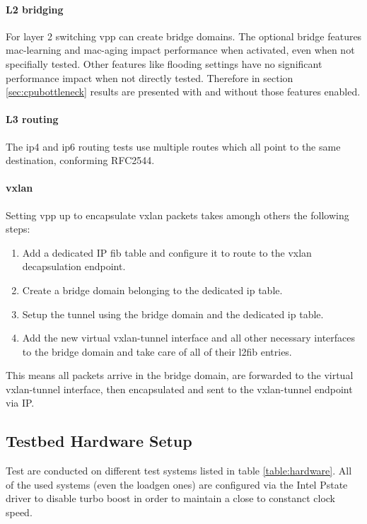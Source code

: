 \paragraph{L2 bridging}

For layer 2 switching \Ac{vpp} can create bridge domains. The optional
bridge features mac-learning and mac-aging impact performance when
activated, even when not specifially tested. Other features like
flooding settings have no significant performance impact when not
directly tested. Therefore in section \ref{sec:cpubottleneck} results
are presented with and without those features enabled.

\paragraph{L3 routing}

The \Ac{ip4} and \Ac{ip6} routing tests use multiple routes which all point to the same destination, conforming RFC2544.

\paragraph{\Ac{vxlan}}

Setting \Ac{vpp} up to encapsulate \Ac{vxlan} packets takes amongh others the following steps: 

\begin{enumerate}
	\item Add a dedicated IP \Ac{fib} table and configure it to route to the \Ac{vxlan} decapsulation endpoint.
	\item Create a bridge domain belonging to the dedicated ip table.
	\item Setup the tunnel using the bridge domain and the dedicated ip table.
	\item Add the new virtual vxlan-tunnel interface and all other necessary interfaces to the bridge domain and take care of all of their l2fib entries. 
\end{enumerate}

This means all packets arrive in the bridge domain, are forwarded to
the virtual vxlan-tunnel interface, then encapsulated and sent to the
vxlan-tunnel endpoint via IP.


\subsection{Testbed Hardware Setup}
\label{sec:hardware}

Test are conducted on different test systems listed in table
\ref{table:hardware}. All of the used systems (even the \Ac{loadgen}
ones) are configured via the Intel Pstate driver to disable turbo
boost in order to maintain a close to constanct clock speed.

